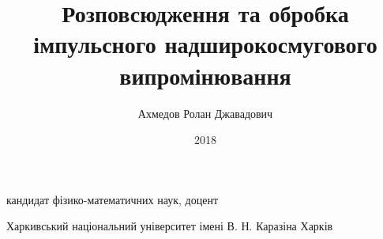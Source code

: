\documentclass{vakthesis}
\theoremstyle{plain}
\theoremstyle{definition}
\theoremstyle{remark}
\begin{document}

\title{Розповсюдження та обробка імпульсного 
надширокосмугового випромінювання}

\author{Ахмедов Ролан Джавадович}

{кандидат фізико-математичних наук, доцент}



\institution
{Харкивський національний університет імені В. Н. Каразіна}
{Харків}

\date{2018}

\maketitle

\tableofcontents










\appendix




\end{document}
